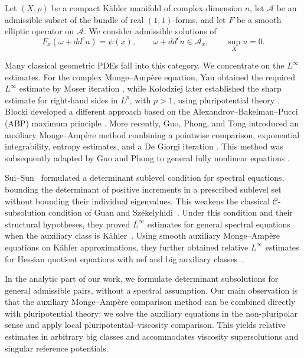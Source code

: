 \documentclass[oneside,english,letterpaper]{amsart}
\numberwithin{equation}{section}
\theoremstyle{plain}
\theoremstyle{definition}
\theoremstyle{remark}
\begin{document}
Let $(X,\rho)$ be a compact K\"ahler
manifold of complex dimension $n$, let $\mathcal A$ be an admissible
subset of the bundle of real $(1,1)$-forms, and let $F$
be a smooth elliptic operator on $\mathcal A$. We consider  admissible
solutions of
\begin{equation}
\label{eq:intro-equation}
F_x(\omega+dd^c u)=\psi(x),
\qquad
\omega+dd^c u\in\mathcal A_x,
\qquad
\sup_Xu=0.
\end{equation}

Many classical geometric PDEs fall into this category. We concentrate on the
$L^\infty$ estimates. For the complex Monge--Amp\`ere   equation, Yau obtained
the required $L^\infty$ estimate by Moser iteration \cite{MR480350}, while
Ko{\l}odziej later established the sharp estimate for right-hand sides in
$L^p$, with $p>1$, using pluripotential theory \cite{MR1618325}.
B{\l}ocki developed a different approach based on the
Alexandrov--Bakelman--Pucci (ABP) maximum principle \cite{MR2156505}.
More recently, Guo, Phong, and Tong introduced an auxiliary
Monge--Amp\`ere method combining a pointwise comparison, exponential
integrability, entropy estimates, and a De Giorgi iteration
\cite{MR4593734}. This method was subsequently adapted by
Guo and Phong to general fully nonlinear equations
\cite{guo2024uniformlinftyestimatessubsolutions}.

Sui--Sun~\cite[condition~(3)]{MR4567566} formulated a determinant
sublevel condition for spectral equations, bounding the determinant
of positive increments in a prescribed sublevel set without
bounding their individual eigenvalues. This weakens the classical
$\mathcal C$-subsolution condition of Guan and
Sz\'ekelyhidi~\cite{MR3284698,MR4727578,MR3807322}.
Under this condition and their structural hypotheses, they proved
$L^\infty$ estimates for general spectral equations when the
auxiliary class is K\"ahler~\cite[Theorem~1.1]{MR4567566}.
Using smooth auxiliary Monge--Amp\`ere equations on K\"ahler
approximations, they further obtained relative $L^\infty$ estimates
for Hessian quotient equations with nef and big auxiliary
classes~\cite[Theorem~1.2]{MR4567566}.

In the analytic part of our work, we formulate determinant
subsolutions for general admissible pairs, without a spectral
assumption. Our main observation is that the auxiliary
Monge--Amp\`ere comparison method
\cite{MR4593734,guo2024uniformlinftyestimatessubsolutions}
can be combined directly with pluripotential theory:
we solve the auxiliary equations in the non-pluripolar sense
and apply local pluripotential--viscosity comparison.
This yields relative estimates in arbitrary big classes and
accommodates viscosity supersolutions and singular reference
potentials.
\end{document}
